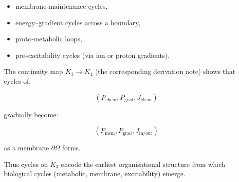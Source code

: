 \begin{itemize}
  \item membrane-maintenance cycles,
  \item energy–gradient cycles across a boundary,
  \item proto-metabolic loops,
  \item pre-excitability cycles (via ion or proton gradients).
\end{itemize}

The continuity map $K_3\to K_4$ (the corresponding derivation note)
shows that cycles of:

\[
  (P_{\mathrm{chem}}, P_{\mathrm{grad}}, J_{\mathrm{chem}})
\]

gradually become:

\[
  (P_{\mathrm{mem}}, P_{\mathrm{grad}}, J_{\mathrm{in/out}})
\]

as a membrane $\partial\Omega$ forms.

Thus cycles on $K_3$ encode the earliest organisational structure 
from which biological cycles (metabolic, membrane, excitability)
emerge.
